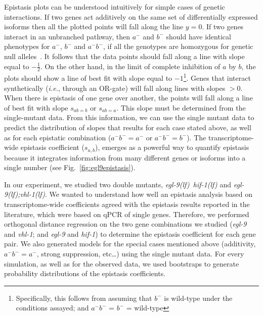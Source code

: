 \documentclass[10pt, onecolumn]{article}
\newcommand{\gene}[1]{\emph{#1}}
\newcommand{\eglvhl}{\emph{\mbox{egl-9(lf);vhl-1(lf)}}}
\newcommand{\eglhif}{\emph{\mbox{egl-9(lf)}~\mbox{hif-1(lf)}}}
\begin{document}
Epistasis plots can be understood intuitively for simple cases of genetic
interactions. If two genes act additively on the same set of differentially expressed
isoforms then all the plotted points will fall along the line $y=0$.
If two genes interact in an unbranched pathway, then $a^-$ and $b^-$ should
have identical phenotypes for $a^-$, $b^-$ and $a^-b^-$, if all the genotypes are
homozygous for genetic null alleles~\cite{Huang2006}. It follows that the
data points should fall along a line with slope equal to $-\frac{1}{2}$. On the
other hand, in the limit of complete inhibition of $a$ by $b$, the plots should show
a line of best fit with slope equal to $-1$\footnote{Specifically, this follows
from assuming that $b^-$ is wild-type under the conditions assayed; and
$a^-b^-$ = $b^-$ = wild-type}.
Genes that interact synthetically (\emph{i.e.}, through an OR-gate) will fall
along lines with slopes $>0$. When there is epistasis of one gene over another,
the points will fall along a line of best fit with slope $s_{ab=b}$ or $s_{ab=a}$.
This slope must be determined from the single-mutant data.
From this information, we can use the single mutant data to predict the
distribution of slopes that results for each case stated above, as well as for
each epistatic combination ($a^-b^-=a^-$ or $a^-b^-=b^-$). The transcriptome-wide
epistasis coefficient ($s_{a, b}$), emerges as a powerful way to quantify epistasis
because it integrates information from many different genes or isoforms into a
single number (see Fig.~\ref{fig:egl9epistasis}).

In our experiment, we studied two double mutants, \eglhif{} and \eglvhl{}.
We wanted to understand how well an epistasis analysis based on transcriptome-wide
coefficients agreed with the epistasis results reported in the literature, which
were based on qPCR of single genes. Therefore, we performed orthogonal distance
regression on the two gene combinations we studied (\gene{egl-9} and
\gene{vhl-1}; and \gene{egl-9} and \gene{hif-1}) to determine the epistasis
coefficient for each gene pair. We also generated models for the special cases
mentioned above (additivity, $a^-b^-=a^-$, strong suppression, etc\ldots) using
the single mutant data. For every simulation, as well as for the observed data,
we used bootstraps to generate probability distributions of the epistasis
coefficients.
\end{document}
